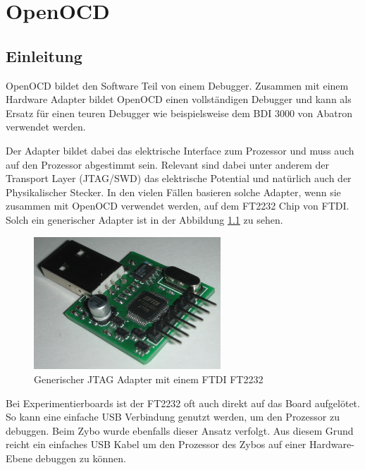 \chapter{OpenOCD}
\section{Einleitung}
OpenOCD\cite{bib:OpenOCDHome} bildet den Software Teil von einem Debugger.
Zusammen mit einem Hardware Adapter bildet OpenOCD einen vollständigen Debugger und kann als Ersatz für einen teuren Debugger wie beispielsweise dem BDI 3000 von Abatron verwendet werden.

Der Adapter bildet dabei das elektrische Interface zum Prozessor und muss auch auf den Prozessor abgestimmt sein.
Relevant sind dabei unter anderem der Transport Layer (JTAG/SWD) das elektrische Potential und natürlich auch der Physikalischer Stecker.
In den vielen Fällen basieren solche Adapter, wenn sie zusammen mit OpenOCD verwendet werden, auf dem FT2232 Chip von FTDI.
Solch ein generischer Adapter ist in der Abbildung \ref{fig:GenerischerFT2232Adapter} zu sehen.

\begin{figure}[htbp]
	\centering
		\includegraphics[width=7cm,keepaspectratio]{images/JTAGAdapter.jpg}
	\caption{Generischer JTAG Adapter mit einem FTDI FT2232\cite{bib:ebayJTAGAdapter}}
	\label{fig:GenerischerFT2232Adapter}
\end{figure}

Bei Experimentierboards ist der FT2232 oft auch direkt auf das Board aufgelötet.
So kann eine einfache USB Verbindung genutzt werden, um den Prozessor zu debuggen.
Beim Zybo wurde ebenfalls dieser Ansatz verfolgt.
Aus diesem Grund reicht ein einfaches USB Kabel um den Prozessor des Zybos auf einer Hardware-Ebene debuggen zu können.

